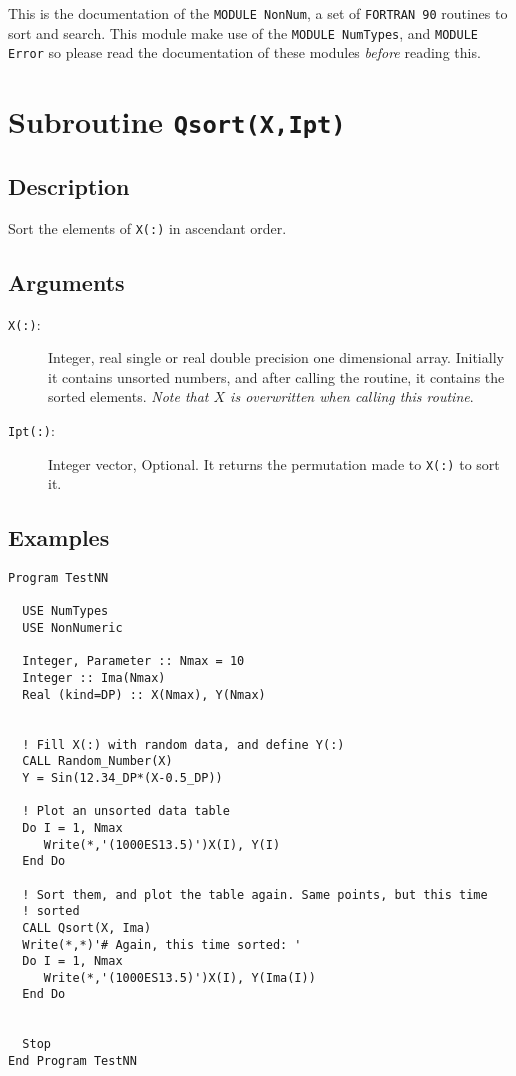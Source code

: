 This is the documentation of the \texttt{MODULE NonNum}, a set
of \texttt{FORTRAN 90} routines to sort and search. This module make
use of the \texttt{MODULE NumTypes}, and \texttt{MODULE Error} so
please read the documentation of these modules \emph{before} reading
this. 

\section{Subroutine \texttt{Qsort(X,Ipt)}}

\subsection{Description}

Sort the elements of \texttt{X(:)} in ascendant order.

\subsection{Arguments}

\begin{description}
\item[\texttt{X(:)}: ] Integer, real single or real double precision one
  dimensional array. Initially it contains unsorted numbers, and after
  calling the routine, it contains the sorted elements. \emph{Note that
    $X$ is overwritten when calling this routine}. 
\item[\texttt{Ipt(:)}: ] Integer vector, Optional. It returns the
  permutation made to \texttt{X(:)} to sort it.
\end{description}

\subsection{Examples}

\begin{lstlisting}[emph=Qsort,
                   emphstyle=\color{blue},
                   frame=trBL,
                   caption=Sorting data.,
                   label=qsort]
Program TestNN

  USE NumTypes
  USE NonNumeric

  Integer, Parameter :: Nmax = 10
  Integer :: Ima(Nmax)
  Real (kind=DP) :: X(Nmax), Y(Nmax)


  ! Fill X(:) with random data, and define Y(:)
  CALL Random_Number(X)
  Y = Sin(12.34_DP*(X-0.5_DP))

  ! Plot an unsorted data table
  Do I = 1, Nmax
     Write(*,'(1000ES13.5)')X(I), Y(I)
  End Do

  ! Sort them, and plot the table again. Same points, but this time
  ! sorted 
  CALL Qsort(X, Ima)
  Write(*,*)'# Again, this time sorted: '
  Do I = 1, Nmax
     Write(*,'(1000ES13.5)')X(I), Y(Ima(I))
  End Do


  Stop
End Program TestNN
\end{lstlisting}



